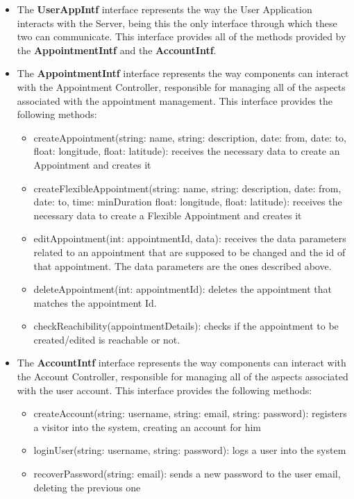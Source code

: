 \documentclass[12pt]{article}
\begin{document}
\begin{itemize}
    \item The \textbf{UserAppIntf} interface represents the way the User Application interacts with the Server, being this the only interface through which these two can communicate. This interface provides all of the methods provided by the \textbf{AppointmentIntf} and the \textbf{AccountIntf}.
    \item The \textbf{AppointmentIntf} interface represents the way components can interact with the Appointment Controller, responsible for managing all of the aspects associated with the appointment management. This interface provides the following methods:
    \begin{itemize}
        \item createAppointment(string: name, string: description, date: from, date: to, float: longitude, float: latitude): receives the necessary data to create an Appointment and creates it
        \item createFlexibleAppointment(string: name, string: description, date: from, date: to, time: minDuration float: longitude, float: latitude): receives the necessary data to create a Flexible Appointment and creates it
        \item editAppointment(int: appointmentId, data): receives the data parameters related to an appointment that are supposed to be changed and the id of that appointment. The data parameters are the ones described above.
        \item deleteAppointment(int: appointmentId): deletes the appointment that matches the appointment Id.
        \item checkReachibility(appointmentDetails): checks if the appointment to be created/edited is reachable or not.
    \end{itemize}
    \item The \textbf{AccountIntf} interface represents the way components can interact with the Account Controller, responsible for managing all of the aspects associated with the user account. This interface provides the following methods:
    \begin{itemize}
        \item createAccount(string: username, string: email, string: password): registers a visitor into the system, creating an account for him
        \item loginUser(string: username, string: password): logs a user into the system
         \item recoverPassword(string: email): sends a new password to the user email, deleting the previous one

\end{itemize}
\end{itemize}
\end{document}
